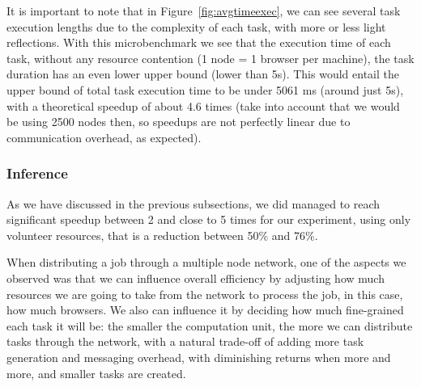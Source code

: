 It is important to note that in Figure~\ref{fig:avgtimeexec}, we can see several task execution lengths due to the complexity of each task, with more or less light reflections. With this microbenchmark we see that the execution time of each task, without any resource contention (1 node = 1 browser per machine), the task duration has an even lower upper bound (lower than 5s). This would entail the upper bound of total task execution time to be under 5061 ms (around just 5s), with a theoretical speedup of about 4.6 times (take into account that we would be using 2500 nodes then, so speedups are not perfectly linear due to communication overhead, as expected).

\subsubsection{Inference}

As we have discussed in the previous subsections, we did managed to reach significant speedup between 2 and close to 5 times for our experiment, using only volunteer resources, that is a reduction between 50\% and 76\%.

When distributing a job through a multiple node network, one of the aspects we observed was that we can influence overall efficiency by adjusting how much resources we are going to take from the network to process the job, in this case, how much browsers. We also can influence it by deciding how much fine-grained each task it will be: the smaller the computation unit, the more we can distribute tasks through the network, with a natural trade-off of adding more task generation and messaging overhead, with diminishing returns when more and more, and smaller tasks are created.
